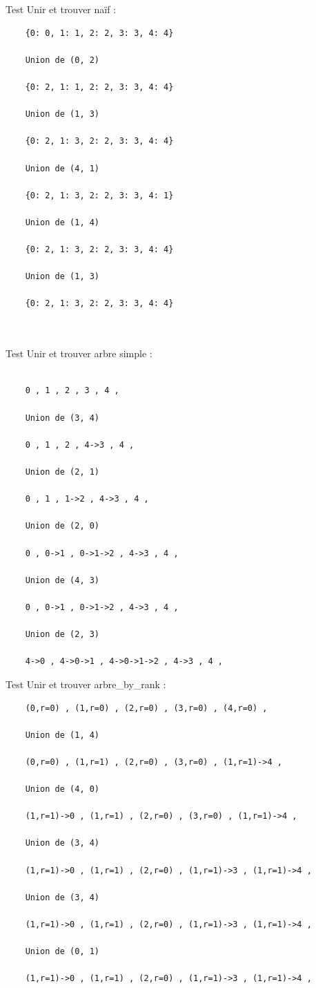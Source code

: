 Test Unir et trouver naïf : 


\begin{verbatim}
    {0: 0, 1: 1, 2: 2, 3: 3, 4: 4}
    
    Union de (0, 2)
    
    {0: 2, 1: 1, 2: 2, 3: 3, 4: 4}
    
    Union de (1, 3)
    
    {0: 2, 1: 3, 2: 2, 3: 3, 4: 4}
    
    Union de (4, 1)
    
    {0: 2, 1: 3, 2: 2, 3: 3, 4: 1}
    
    Union de (1, 4)
    
    {0: 2, 1: 3, 2: 2, 3: 3, 4: 4}
    
    Union de (1, 3)
    
    {0: 2, 1: 3, 2: 2, 3: 3, 4: 4}
    
    
\end{verbatim}

Test Unir et trouver arbre simple : 

\begin{verbatim}
    
    0 , 1 , 2 , 3 , 4 , 
    
    Union de (3, 4)
    
    0 , 1 , 2 , 4->3 , 4 , 
    
    Union de (2, 1)
    
    0 , 1 , 1->2 , 4->3 , 4 , 
    
    Union de (2, 0)
    
    0 , 0->1 , 0->1->2 , 4->3 , 4 , 
    
    Union de (4, 3)
    
    0 , 0->1 , 0->1->2 , 4->3 , 4 , 
    
    Union de (2, 3)
    
    4->0 , 4->0->1 , 4->0->1->2 , 4->3 , 4 , 
\end{verbatim}


Test Unir et trouver arbre\_by\_rank : 


\begin{verbatim}
    (0,r=0) , (1,r=0) , (2,r=0) , (3,r=0) , (4,r=0) , 
    
    Union de (1, 4)
    
    (0,r=0) , (1,r=1) , (2,r=0) , (3,r=0) , (1,r=1)->4 , 
    
    Union de (4, 0)
    
    (1,r=1)->0 , (1,r=1) , (2,r=0) , (3,r=0) , (1,r=1)->4 , 
    
    Union de (3, 4)
    
    (1,r=1)->0 , (1,r=1) , (2,r=0) , (1,r=1)->3 , (1,r=1)->4 , 
    
    Union de (3, 4)
    
    (1,r=1)->0 , (1,r=1) , (2,r=0) , (1,r=1)->3 , (1,r=1)->4 , 
    
    Union de (0, 1)
    
    (1,r=1)->0 , (1,r=1) , (2,r=0) , (1,r=1)->3 , (1,r=1)->4 , 
    
    
\end{verbatim}


